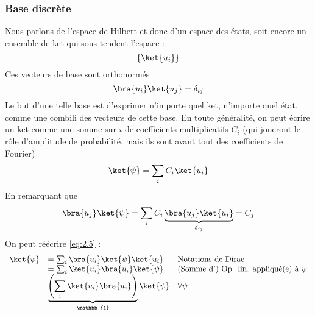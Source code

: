 \subsubsection{Base discrète}
Nous parlons de l'espace de Hilbert et donc d'un espace des états, soit encore un ensemble 
de ket qui sous-tendent l'espace :
\begin{equation}
\left\{\ket{u_i}\right\}
\end{equation}
Ces vecteurs de base sont orthonormés
\begin{equation}
\bra{u_i}\ket{u_j} = \delta_{ij}
\end{equation}
Le but d'une telle base est d'exprimer n'importe quel ket, n'importe quel état, comme une 
combili des vecteurs de cette base. En toute généralité, on peut écrire un ket comme une 
somme sur $i$ de coefficients multiplicatifs $C_i$ (qui joueront le rôle d'amplitude de 
probabilité, mais ils sont avant tout des coefficients de Fourier)
\begin{equation}
\ket{\psi} = \sum_i C_i\ket{u_i}
\label{eq:2.5}
\end{equation}
En remarquant que
\begin{equation}
\bra{u_j}\ket{\psi} = \sum_iC_i\underbrace{\bra{u_j}\ket{u_i}}_{\delta_{ij}} = C_j
\end{equation}
On peut réécrire \autoref{eq:2.5} :
\begin{equation}
\begin{array}{lll}
\ket{\psi} &= \sum_i \bra{u_i}\ket{\psi}\ket{u_i} & \text{Notations de Dirac}\\
&= \sum_i \ket{u_i}\bra{u_i}\ket{\psi} & \text{(Somme d') Op. lin. appliqué(e) à $\psi$}\\
&\underbrace{\left(\sum_i \ket{u_i}\bra{u_i}\right)}_{\mathbb{1}}\ket{\psi} & \forall\psi
\end{array}
\end{equation}

